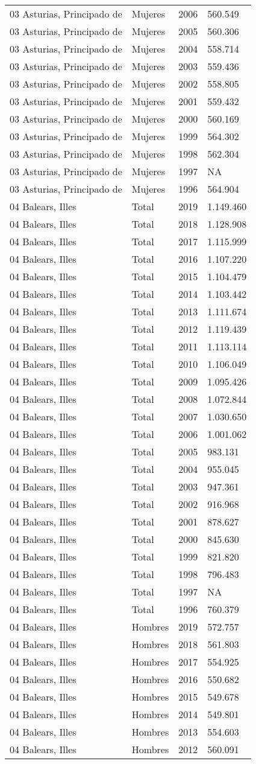 \documentclass[
]{article}
\begin{document}
\begin{longtable}[]{@{}llrl@{}}
03 Asturias, Principado de & Mujeres & 2006 & 560.549\tabularnewline
03 Asturias, Principado de & Mujeres & 2005 & 560.306\tabularnewline
03 Asturias, Principado de & Mujeres & 2004 & 558.714\tabularnewline
03 Asturias, Principado de & Mujeres & 2003 & 559.436\tabularnewline
03 Asturias, Principado de & Mujeres & 2002 & 558.805\tabularnewline
03 Asturias, Principado de & Mujeres & 2001 & 559.432\tabularnewline
03 Asturias, Principado de & Mujeres & 2000 & 560.169\tabularnewline
03 Asturias, Principado de & Mujeres & 1999 & 564.302\tabularnewline
03 Asturias, Principado de & Mujeres & 1998 & 562.304\tabularnewline
03 Asturias, Principado de & Mujeres & 1997 & NA\tabularnewline
03 Asturias, Principado de & Mujeres & 1996 & 564.904\tabularnewline
04 Balears, Illes & Total & 2019 & 1.149.460\tabularnewline
04 Balears, Illes & Total & 2018 & 1.128.908\tabularnewline
04 Balears, Illes & Total & 2017 & 1.115.999\tabularnewline
04 Balears, Illes & Total & 2016 & 1.107.220\tabularnewline
04 Balears, Illes & Total & 2015 & 1.104.479\tabularnewline
04 Balears, Illes & Total & 2014 & 1.103.442\tabularnewline
04 Balears, Illes & Total & 2013 & 1.111.674\tabularnewline
04 Balears, Illes & Total & 2012 & 1.119.439\tabularnewline
04 Balears, Illes & Total & 2011 & 1.113.114\tabularnewline
04 Balears, Illes & Total & 2010 & 1.106.049\tabularnewline
04 Balears, Illes & Total & 2009 & 1.095.426\tabularnewline
04 Balears, Illes & Total & 2008 & 1.072.844\tabularnewline
04 Balears, Illes & Total & 2007 & 1.030.650\tabularnewline
04 Balears, Illes & Total & 2006 & 1.001.062\tabularnewline
04 Balears, Illes & Total & 2005 & 983.131\tabularnewline
04 Balears, Illes & Total & 2004 & 955.045\tabularnewline
04 Balears, Illes & Total & 2003 & 947.361\tabularnewline
04 Balears, Illes & Total & 2002 & 916.968\tabularnewline
04 Balears, Illes & Total & 2001 & 878.627\tabularnewline
04 Balears, Illes & Total & 2000 & 845.630\tabularnewline
04 Balears, Illes & Total & 1999 & 821.820\tabularnewline
04 Balears, Illes & Total & 1998 & 796.483\tabularnewline
04 Balears, Illes & Total & 1997 & NA\tabularnewline
04 Balears, Illes & Total & 1996 & 760.379\tabularnewline
04 Balears, Illes & Hombres & 2019 & 572.757\tabularnewline
04 Balears, Illes & Hombres & 2018 & 561.803\tabularnewline
04 Balears, Illes & Hombres & 2017 & 554.925\tabularnewline
04 Balears, Illes & Hombres & 2016 & 550.682\tabularnewline
04 Balears, Illes & Hombres & 2015 & 549.678\tabularnewline
04 Balears, Illes & Hombres & 2014 & 549.801\tabularnewline
04 Balears, Illes & Hombres & 2013 & 554.603\tabularnewline
04 Balears, Illes & Hombres & 2012 & 560.091\tabularnewline

\end{longtable}
\end{document}
